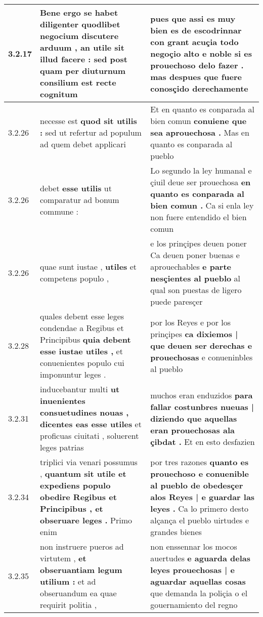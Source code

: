 \begin{tabular}{|p{1cm}|p{6.5cm}|p{6.5cm}|}
3.2.17 & Bene ergo se habet diligenter quodlibet negocium discutere arduum , \textbf{ an utile sit illud facere : } sed post quam per diuturnum consilium est recte cognitum & pues que assi es muy bien es de escodrinnar con grant acuçia todo negoçio alto e noble \textbf{ si es prouechoso delo fazer . } mas despues que fuere conosçido derechamente \\\hline
3.2.26 & necesse est \textbf{ quod sit utilis : } sed ut refertur ad populum ad quem debet applicari & Et en quanto es conparada al bien comun \textbf{ conuiene que sea aprouechosa . } Mas en quanto es conparada al pueblo \\\hline
3.2.26 & debet \textbf{ esse utilis } ut comparatur ad bonum commune : & Lo segundo la ley humanal e çiuil deue ser prouechosa \textbf{ en quanto es conparada al bien comun . } Ca si enla ley non fuere entendido el bien comun \\\hline
3.2.26 & quae sunt iustae , \textbf{ utiles } et competens populo , & e los prinçipes deuen poner Ca deuen poner buenas e aprouechables \textbf{ e parte nesçientes al pueblo } al qual son puestas de ligero puede paresçer \\\hline
3.2.28 & quales debent esse leges condendae a Regibus et Principibus \textbf{ quia debent esse iustae utiles , } et conuenientes populo cui imponuntur leges . & por los Reyes e por los prinçipes \textbf{ ca dixiemos | que deuen ser derechas e prouechosas } e conueninbles al pueblo \\\hline
3.2.31 & inducebantur multi \textbf{ ut inuenientes consuetudines nouas , dicentes eas esse utiles } et proficuas ciuitati , soluerent leges patrias & muchos eran enduzidos \textbf{ para fallar costunbres nueuas | diziendo que aquellas eran prouechosas ala çibdat . } Et en esto desfazien \\\hline
3.2.34 & triplici via venari possumus , \textbf{ quantum sit utile et expediens populo obedire Regibus et Principibus , et obseruare leges . } Primo enim & por tres razones \textbf{ quanto es prouechoso e conuenible al pueblo de obedesçer alos Reyes | e guardar las leyes . } Ca lo primero desto alçança el pueblo uirtudes e grandes bienes \\\hline
3.2.35 & non instruere pueros ad virtutem , \textbf{ et obseruantiam legum utilium : } et ad obseruandum ea quae requirit politia , & non enssennar los mocos auertudes \textbf{ e aguarda delas leyes prouechosas | e aguardar aquellas cosas } que demanda la poliçia o el gouernamiento del regno \\\hline

\end{tabular}
